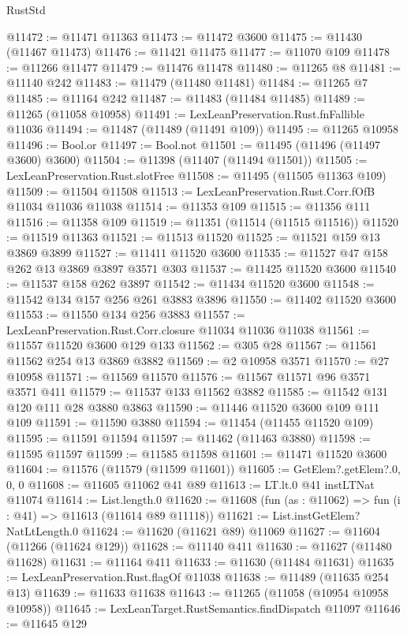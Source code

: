\begin{lexlean}{RustStd}
\begin{coremodule}
@11472 := @11471 @11363
@11473 := @11472 @3600
@11475 := @11430 (@11467 @11473)
@11476 := @11421 @11475
@11477 := @11070 @109
@11478 := @11266 @11477
@11479 := @11476 @11478
@11480 := @11265 @8
@11481 := @11140 @242
@11483 := @11479 (@11480 @11481)
@11484 := @11265 @7
@11485 := @11164 @242
@11487 := @11483 (@11484 @11485)
@11489 := @11265 (@11058 @10958)
@11491 := LexLeanPreservation.Rust.fnFallible @11036
@11494 := @11487 (@11489 (@11491 @109))
@11495 := @11265 @10958
@11496 := Bool.or
@11497 := Bool.not
@11501 := @11495 (@11496 (@11497 @3600) @3600)
@11504 := @11398 (@11407 (@11494 @11501))
@11505 := LexLeanPreservation.Rust.slotFree
@11508 := @11495 (@11505 @11363 @109)
@11509 := @11504 @11508
@11513 := LexLeanPreservation.Rust.Corr.fOfB @11034 @11036 @11038
@11514 := @11353 @109
@11515 := @11356 @111
@11516 := @11358 @109
@11519 := @11351 (@11514 (@11515 @11516))
@11520 := @11519 @11363
@11521 := @11513 @11520
@11525 := @11521 @159 @13 @3869 @3899
@11527 := @11411 @11520 @3600
@11535 := @11527 @47 @158 @262 @13 @3869 @3897 @3571 @303
@11537 := @11425 @11520 @3600
@11540 := @11537 @158 @262 @3897
@11542 := @11434 @11520 @3600
@11548 := @11542 @134 @157 @256 @261 @3883 @3896
@11550 := @11402 @11520 @3600
@11553 := @11550 @134 @256 @3883
@11557 := LexLeanPreservation.Rust.Corr.closure @11034 @11036 @11038
@11561 := @11557 @11520 @3600 @129 @133
@11562 := @305 @28
@11567 := @11561 @11562 @254 @13 @3869 @3882
@11569 := @2 @10958 @3571
@11570 := @27 @10958
@11571 := @11569 @11570
@11576 := @11567 @11571 @96 @3571 @3571 @411
@11579 := @11537 @133 @11562 @3882
@11585 := @11542 @131 @120 @111 @28 @3880 @3863
@11590 := @11446 @11520 @3600 @109 @111 @109
@11591 := @11590 @3880
@11594 := @11454 (@11455 @11520 @109)
@11595 := @11591 @11594
@11597 := @11462 (@11463 @3880)
@11598 := @11595 @11597
@11599 := @11585 @11598
@11601 := @11471 @11520 @3600
@11604 := @11576 (@11579 (@11599 @11601))
@11605 := GetElem?.getElem?.{0, 0, 0}
@11608 := @11605 @11062 @41 @89
@11613 := LT.lt.{0} @41 instLTNat @11074
@11614 := List.length.{0}
@11620 := @11608 (fun (as : @11062) => fun (i : @41) => @11613 (@11614 @89 @11118))
@11621 := List.instGetElem?NatLtLength.{0}
@11624 := @11620 (@11621 @89) @11069
@11627 := @11604 (@11266 (@11624 @129))
@11628 := @11140 @411
@11630 := @11627 (@11480 @11628)
@11631 := @11164 @411
@11633 := @11630 (@11484 @11631)
@11635 := LexLeanPreservation.Rust.flagOf @11038
@11638 := @11489 (@11635 @254 @13)
@11639 := @11633 @11638
@11643 := @11265 (@11058 (@10954 @10958 @10958))
@11645 := LexLeanTarget.RustSemantics.findDispatch @11097
@11646 := @11645 @129

\end{coremodule}
\end{lexlean}
